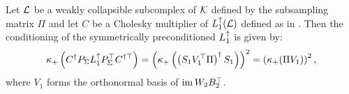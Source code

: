 \begin{theorem}
      \label{thm:cond_weight}
      Let \( \mathcal{L} \) be a weakly collapsible subcomplex of \( \mathcal{K} \) defined by the subsampling matrix \( \Pi \) and let \( C \) be a Cholesky multiplier of \( L_{1}^{\uparrow} (\mathcal{L}) \) defined as in . Then
             the conditioning of the symmetrically preconditioned \( L_{1}^{\uparrow} \) is given by:
            \begin{equation*}
                  \kappa_+ \left( C^\dagger P_\Sigma L_{1}^{\uparrow} P_\Sigma^\top C^{\dagger \top} \right) = \left( \kappa_+ \left( \left( S_1 V_1^\top \Pi \right)^\dagger S_1 \right) \right)^2 = \left( \kappa_+ ( \Pi V_1 ) \right)^2, 
            \end{equation*}
            where \( V_1 \) forms the orthonormal basis of \( \operatorname{im} W_2 B_2^\top \).
\end{theorem}
